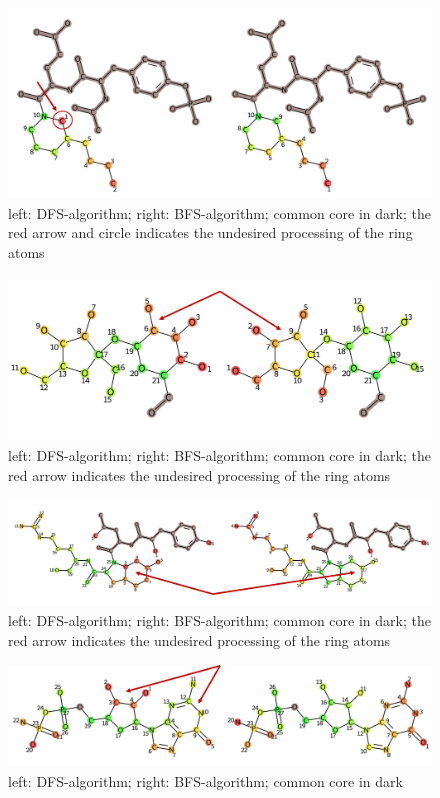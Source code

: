 \begin{figure}
\includegraphics[scale=1.3]{simple_ring_exampledfs3}\caption{left: DFS-algorithm; right: BFS-algorithm; common core in dark; the
red arrow and circle indicates the undesired processing of the ring
atoms}

\end{figure}
\begin{figure}

\includegraphics[scale=0.5]{simple_ring_exampledfs4}\caption{left: DFS-algorithm; right: BFS-algorithm; common core in dark; the
red arrow indicates the undesired processing of the ring atoms}

\end{figure}

\begin{figure}

\includegraphics[scale=0.5]{2ring_example}\caption{left: DFS-algorithm; right: BFS-algorithm; common core in dark; the
red arrow indicates the undesired processing of the ring atoms}

\end{figure}

\begin{figure}

\includegraphics[scale=0.5]{2ring_example2}\caption{left: DFS-algorithm; right: BFS-algorithm; common core in dark}

\end{figure}
